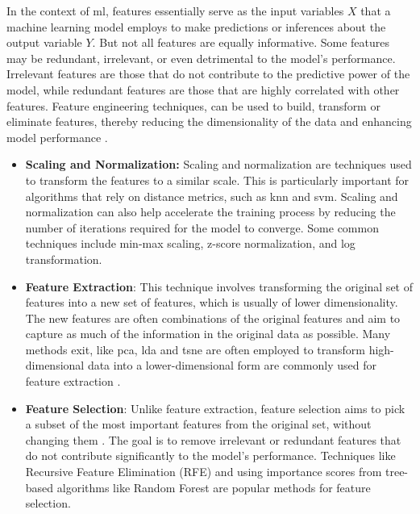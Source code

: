     In the context of \acrlong{ml}, features essentially serve as the input variables $ X $ that a machine learning model employs to make predictions or inferences about the output variable $ Y $. But not all features are equally informative. Some features may be redundant, irrelevant, or even detrimental to the model's performance. Irrelevant features are those that do not contribute to the predictive power of the model, while redundant features are those that are highly correlated with other features. Feature engineering techniques, can be used to build, transform or eliminate features, thereby reducing the dimensionality of the data and enhancing model performance \cite{FeatureSelecExtract14}.

    \begin{itemize}
        \item \textbf{Scaling and Normalization:} Scaling and normalization are techniques used to transform the features to a similar scale. This is particularly important for algorithms that rely on distance metrics, such as \acrfull{knn} and \acrfull{svm}. Scaling and normalization can also help accelerate the training process by reducing the number of iterations required for the model to converge. Some common techniques include min-max scaling, z-score normalization, and log transformation.
        
        \item \textbf{Feature Extraction}: This technique involves transforming the original set of features into a new set of features, which is usually of lower dimensionality. The new features are often combinations of the original features and aim to capture as much of the information in the original data as possible. Many methods exit, like \acrfull{pca}, \acrfull{lda} and \acrfull{tsne} are often employed to transform high-dimensional data into a lower-dimensional form are commonly used for feature extraction \cite{FeatureSelecExtract14}.
        
        \item \textbf{Feature Selection}: Unlike feature extraction, feature selection aims to pick a subset of the most important features from the original set, without changing them \cite{FeatureSelecExtract14}. The goal is to remove irrelevant or redundant features that do not contribute significantly to the model's performance. Techniques like Recursive Feature Elimination (RFE) and using importance scores from tree-based algorithms like Random Forest are popular methods for feature selection.
    \end{itemize}

